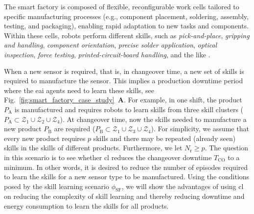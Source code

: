 \documentclass[12pt]{article}
\begin{document}
The smart factory is composed of flexible, reconfigurable work cells tailored to specific manufacturing processes (e.g., component placement, soldering, assembly, testing, and packaging), enabling rapid adaptation to new tasks and components. Within these cells, robots perform different skills, such as \textit{pick-and-place}, \textit{gripping and handling}, \textit{component orientation}, \textit{precise solder application}, \textit{optical inspection}, \textit{force testing}, \textit{printed-circuit-board handling}, and the like \cite{Kirschner2025CategorizingRB}. 

When a new sensor is required, that is, in changeover time, a new set of skills is required to manufacture the sensor. This implies a production downtime period where the \ac{eai} agents need to learn these skills, see Fig.~\ref{fig:smart_factory_case_study}~\textbf{A}. For example, in one shift, the product $ P_\mathrm{A} $ is manufactured and requires robots to learn skills from three skill clusters ($ P_\text{A}\subset\mathcal{Z}_1
\cup\mathcal{Z}_2\cup\mathcal{Z}_4 $). At changeover time, now the skills needed to manufacture a new product $ P_\mathrm{B} $ are required ($P_\text{B}\subset\mathcal{Z}_1\cup\mathcal{Z}_3\cup\mathcal{Z}_4 $). For simplicity, we assume that every new product requires $ p $ skills and there may be repeated (already seen) skills in the skills of different products. Furthermore, we let $ N_\mathrm{r} \geq p $. The question in this scenario is to see whether \ac{cl} reduces the changeover downtime $ T_\mathrm{CO} $ to a minimum. In other words, it is desired to reduce the number of episodes required to learn the skills for a new sensor type to be manufactured. Using the conditions posed by the skill learning scenario $ \phi_\text{SF}$, we will show the advantages of using \ac{cl} on reducing the complexity of skill learning and thereby reducing downtime and energy consumption to learn the skills for all products.
\end{document}
